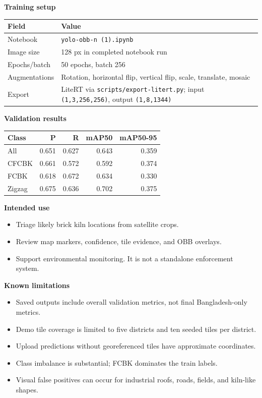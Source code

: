 \documentclass[9pt]{article}
\begin{document}
\begin{multicols}{2}
\textbf{Training setup}\\[0.05em]
\begin{tabularx}{\linewidth}{@{}lY@{}}
\toprule
Field & Value \\
\midrule
Notebook & \texttt{yolo-obb-n (1).ipynb} \\
Image size & 128 px in completed notebook run \\
Epochs/batch & 50 epochs, batch 256 \\
Augmentations & Rotation, horizontal flip, vertical flip, scale, translate, mosaic \\
Export & LiteRT via \texttt{scripts/export-litert.py}; input \texttt{(1,3,256,256)}, output \texttt{(1,8,1344)} \\
\bottomrule
\end{tabularx}

\columnbreak

\textbf{Validation results}\\[0.05em]
\begin{tabularx}{\linewidth}{@{}lrrrr@{}}
\toprule
Class & P & R & mAP50 & mAP50-95 \\
\midrule
All & 0.651 & 0.627 & 0.643 & 0.359 \\
CFCBK & 0.661 & 0.572 & 0.592 & 0.374 \\
FCBK & 0.618 & 0.672 & 0.634 & 0.330 \\
Zigzag & 0.675 & 0.636 & 0.702 & 0.375 \\
\bottomrule
\end{tabularx}

\textbf{Intended use}\\[-0.2em]
\begin{itemize}
  \item Triage likely brick kiln locations from satellite crops.
  \item Review map markers, confidence, tile evidence, and OBB overlays.
  \item Support environmental monitoring. It is not a standalone enforcement system.
\end{itemize}

\textbf{Known limitations}\\[-0.2em]
\begin{itemize}
  \item Saved outputs include overall validation metrics, not final Bangladesh-only metrics.
  \item Demo tile coverage is limited to five districts and ten seeded tiles per district.
  \item Upload predictions without georeferenced tiles have approximate coordinates.
  \item Class imbalance is substantial; FCBK dominates the train labels.
  \item Visual false positives can occur for industrial roofs, roads, fields, and kiln-like shapes.
\end{itemize}


\end{multicols}
\end{document}

